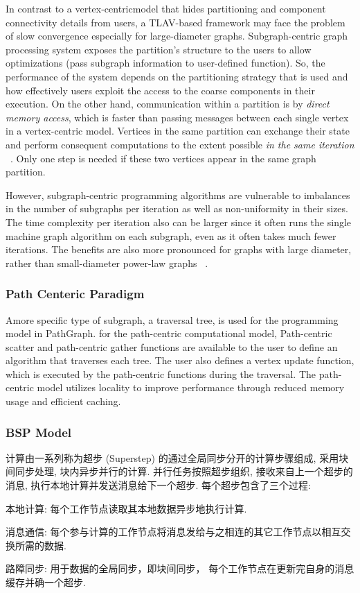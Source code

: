 \documentclass[UTF8,12pt,a4paper]{article}
\begin{document}
In contrast to a vertex-centricmodel that hides partitioning
and component connectivity details from users,
a TLAV-based framework may face the problem of slow convergence 
especially for large-diameter graphs.
Subgraph-centric graph processing system
exposes the partition’s structure to the users to allow optimizations
(pass subgraph information to user-defined function).
So, the performance of the system depends on the partitioning strategy that is used
and how effectively users exploit the access to the coarse components in their execution.
On the other hand, communication within a partition is by \textit{direct memory access},
which is faster than passing messages between each single vertex in a vertex-centric model.
Vertices in the same partition can exchange their state
and perform consequent computations to the extent possible \textit{in the same iteration}
~\cite{DBLP:journals/csur/HeidariSCB18}.
Only one step is needed if these two vertices appear in the same graph partition.

However, subgraph-centric programming algorithms are vulnerable
to imbalances in the number of subgraphs per iteration
as well as non-uniformity in their sizes.
The time complexity per iteration also can be larger
since it often runs the single machine graph algorithm on each subgraph,
even as it often takes much fewer iterations.
The benefits are also more pronounced for graphs with large diameter,
rather than small-diameter power-law graphs
~\cite{DBLP:journals/csur/HeidariSCB18}.
\subsubsection{Path Centeric Paradigm}
Amore specific type of subgraph, a traversal tree,
is used for the programming model in PathGraph.
for the path-centric computational model,
Path-centric scatter and path-centric gather functions
are available to the user to define an algorithm that traverses each tree.
The user also defines a vertex update function,
which is executed by the path-centric functions during the traversal.
The path-centric model utilizes locality to improve performance
through reduced memory usage and efficient caching.
\subsubsection{BSP Model}
计算由一系列称为超步 (Superstep) 的通过全局同步分开的计算步骤组成,
采用块间同步处理, 块内异步并行的计算.
并行任务按照超步组织, 接收来自上一个超步的消息, 执行本地计算并发送消息给下一个超步.
每个超步包含了三个过程:
\begin{compactitem}
  \item 本地计算: 每个工作节点读取其本地数据异步地执行计算.
  \item 消息通信: 
  每个参与计算的工作节点将消息发给与之相连的其它工作节点以相互交换所需的数据.
  \item 路障同步: 用于数据的全局同步，即块间同步，
  每个工作节点在更新完自身的消息缓存并确一个超步.
\end{compactitem}
\end{document}

